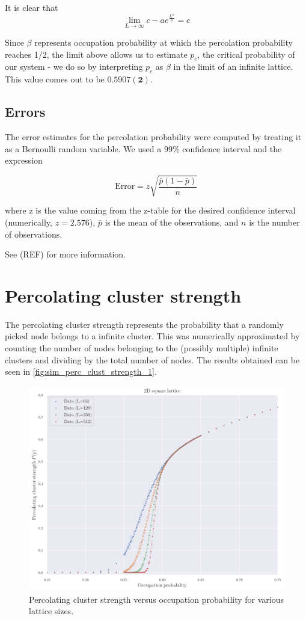 It is clear that 
$$ 
\lim_{L\to\infty} c - a e^{\frac{L^n}{b}} = c
$$

Since $\beta$ represents occupation probability at which the percolation probability reaches 1/2, the limit above allows us to estimate $p_c$, the critical probability of our system - we do so by interpreting $p_c$ as $\beta$ in the limit of an infinite lattice. This value comes out to be $\mathbf{0.5907(2)}$.

\subsection{Errors}

The error estimates for the percolation probability were computed by treating it as a Bernoulli random variable. We used a 99\% confidence interval and the expression 

$$ 
\textrm{Error} = z \sqrt{\frac{\bar{p}(1-\bar{p})}{n}}
$$

where z is the value coming from the z-table for the desired confidence interval (numerically, $z=2.576$), $\bar{p}$ is the mean of the observations, and $n$ is the number of observations.

See (REF) for more information.

\section{Percolating cluster strength}

The percolating cluster strength represents the probability that a randomly picked node belongs to a infinite cluster. This was numerically approximated by counting the number of nodes belonging to the (possibly multiple) infinite clusters and dividing by the total number of nodes. The results obtained can be seen in \autoref{fig:sim_perc_clust_strength_1}.

\begin{figure}[H]
  \includegraphics[width=\linewidth]{Images/sim_perc_clust_strength_1.png}
  \caption{Percolating cluster strength versus occupation probability for various lattice sizes.}
  \label{fig:sim_perc_clust_strength_1}
\end{figure}

